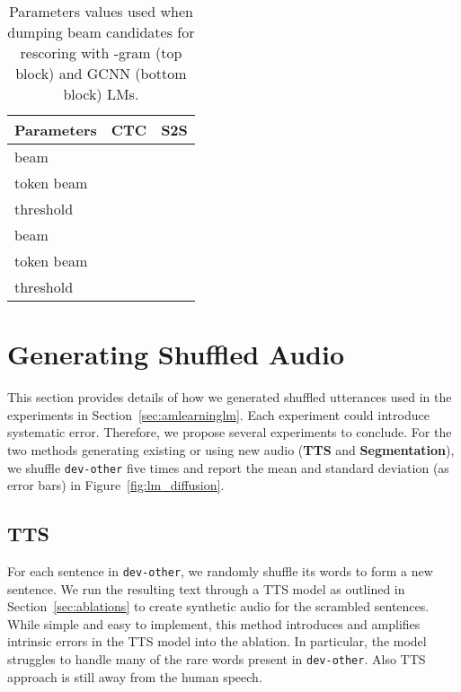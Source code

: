\documentclass{article}
\def\devother{\texttt{dev-other}}
\begin{document}
\begin{table}[h!]
\caption{Parameters values used when dumping beam candidates for rescoring with -gram (top block) and GCNN (bottom block) LMs.\label{tab:rescoreappendix} }
\vskip 0.1in
\begin{center}
\begin{small}
\begin{sc}
\begin{tabular}{lcc}
    \toprule
    Parameters & CTC & S2S \\
    \midrule
    beam &  &  \\
    token beam &  &  \\
    threshold &  &  \\
    \midrule
    beam &  &  \\
    token beam &  &  \\
    threshold &  &  \\
    \bottomrule
    \end{tabular}\end{sc}
\end{small}
\end{center}
\vskip -0.1in
\end{table}


\section{Generating Shuffled Audio}
This section provides details of how we generated shuffled utterances used in the experiments in Section~\ref{sec:amlearninglm}. Each experiment could introduce systematic error. Therefore, we propose several experiments to conclude. For the two methods generating existing or using new audio (\textbf{TTS} and \textbf{Segmentation}), we shuffle \devother{} five times and report the mean and standard deviation (as error bars) in Figure~\ref{fig:lm_diffusion}.

\subsection{TTS}
For each sentence in \devother{}, we randomly shuffle its words to form a new sentence. We run the resulting text through a TTS model as outlined in Section~\ref{sec:ablations} to create synthetic audio for the scrambled sentences. While simple and easy to implement, this method introduces and amplifies intrinsic errors in the TTS model into the ablation. In particular, the model struggles to handle many of the rare words present in \devother{}. Also TTS approach is still away from the human speech.
\end{document}

